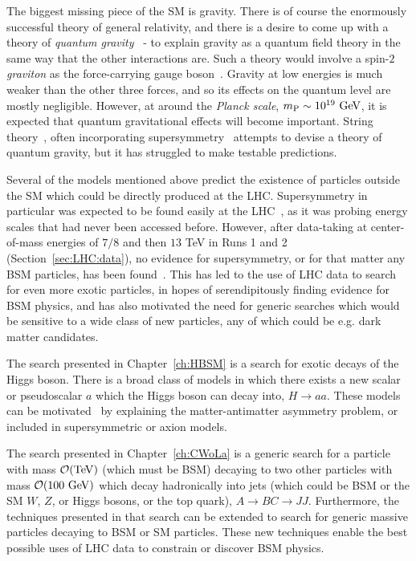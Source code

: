 The biggest missing piece of the SM is gravity.
There is of course the enormously successful theory of general relativity, and there is a desire to come up with a theory of \textit{quantum gravity}~\cite{Rovelli:2000aw,Ashtekar_1974,Ashtekar:2014kba} - to explain gravity as a quantum field theory in the same way that the other interactions are.
Such a theory would involve a spin-$2$ \textit{graviton} as the force-carrying gauge boson~\cite{PhysRev.98.1118}.
Gravity at low energies is much weaker than the other three forces, and so its effects on the quantum level are mostly negligible.
However, at around the \textit{Planck scale}, $m_\text{P}\sim 10^{19}~\mathrm{GeV}$, it is expected that quantum gravitational effects will become important.
String theory~\cite{Mukhi:2011zz}, often incorporating supersymmetry~\cite{wess_bagger_2009,Schwarz:1998ny} attempts to devise a theory of quantum gravity, but it has struggled to make testable predictions.


Several of the models mentioned above predict the existence of particles outside the SM which could be directly produced at the LHC.
Supersymmetry in particular was expected to be found easily at the LHC~\cite{Ellis:2008di}, as it was probing energy scales that had never been accessed before.
However, after data-taking at center-of-mass energies of $7/8$ and then $13$ TeV in Runs 1 and 2 (Section~\ref{sec:LHC:data}), no evidence for supersymmetry, or for that matter any BSM particles, has been found~\cite{Baer:2020kwz}.
This has led to the use of LHC data to search for even more exotic particles, in hopes of serendipitously finding evidence for BSM physics, and has also motivated the need for generic searches which would be sensitive to a wide class of new particles, any of which could be e.g. dark matter candidates.

The search presented in Chapter~\ref{ch:HBSM} is a search for exotic decays of the Higgs boson.
There is a broad class of models in which there exists a new scalar or pseudoscalar $a$ which the Higgs boson can decay into, $H\rightarrow aa$.
These models can be motivated~\cite{Curtin:2013fra} by explaining the matter-antimatter asymmetry problem, or included in supersymmetric or axion models.

The search presented in Chapter~\ref{ch:CWoLa} is a generic search for a particle with mass $\mathcal{O}(\mathrm{TeV})$ (which must be BSM) decaying to two other particles with mass $\mathcal{O}(100~\mathrm{GeV})$ which decay hadronically into jets (which could be BSM or the SM $W$, $Z$, or Higgs bosons, or the top quark), $A\rightarrow BC \rightarrow JJ$.
Furthermore, the techniques presented in that search can be extended to search for generic massive particles decaying to BSM or SM particles.
These new techniques enable the best possible uses of LHC data to constrain or discover BSM physics.
